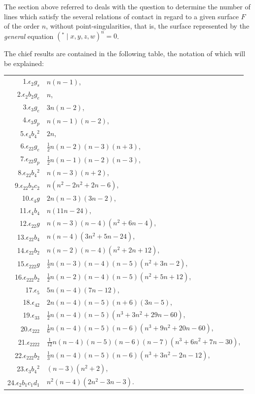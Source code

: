 \documentclass[11pt,a4paper]{book}
\begin{document}
The section above referred to deals with the question to determine the number of lines which satisfy the several relations of contact in regard to a given surface $F$ of the order $n$, without point-singularities, that is, the surface represented by the \textit{general} equation $({}^*\mid x, y, z, w)^n = 0$.

The chief results are contained in the following table, the notation of which will be explained:

\begin{center}
\begin{tabular}{r @{\ $=$\ }l}
1.\quad $\epsilon_2 g_s$ & $n(n-1)$, \\[2pt]
2.\quad $\epsilon_2 b_2 g_e$ & $n$, \\[2pt]
3.\quad $\epsilon_3 g_e$ & $3n(n-2)$, \\[2pt]
4.\quad $\epsilon_3 g_p$ & $n(n-1)(n-2)$, \\[2pt]
5.\quad $\epsilon_4 b_4{}^2$ & $2n$, \\[2pt]
6.\quad $\epsilon_{22} g_e$ & $\frac{1}{2}n(n-2)(n-3)(n+3)$, \\[2pt]
7.\quad $\epsilon_{22} g_p$ & $\frac{1}{2}n(n-1)(n-2)(n-3)$, \\[2pt]
8.\quad $\epsilon_{22} b_4{}^2$ & $n(n-3)(n+2)$, \\[2pt]
9.\quad $\epsilon_{22} b_2 c_2$ & $n(n^2 - 2n^2 + 2n - 6)$, \\[2pt]
10.\quad $\epsilon_4 g$ & $2n(n-3)(3n-2)$, \\[2pt]
11.\quad $\epsilon_4 b_4$ & $n(11n - 24)$, \\[2pt]
12.\quad $\epsilon_{22} g$ & $n(n-3)(n-4)(n^2 + 6n - 4)$, \\[2pt]
13.\quad $\epsilon_{22} b_4$ & $n(n-4)(3n^2 + 5n - 24)$, \\[2pt]
14.\quad $\epsilon_{22} b_2$ & $n(n-2)(n-4)(n^2 + 2n + 12)$, \\[2pt]
15.\quad $\epsilon_{222} g$ & $\frac{1}{3}n(n-3)(n-4)(n-5)(n^2 + 3n - 2)$, \\[2pt]
16.\quad $\epsilon_{222} b_2$ & $\frac{1}{2}n(n-2)(n-4)(n-5)(n^2 + 5n + 12)$, \\[2pt]
17.\quad $\epsilon_5$ & $5n(n-4)(7n - 12)$, \\[2pt]
18.\quad $\epsilon_{42}$ & $2n(n-4)(n-5)(n+6)(3n-5)$, \\[2pt]
19.\quad $\epsilon_{33}$ & $\frac{1}{2}n(n-4)(n-5)(n^3 + 3n^2 + 29n - 60)$, \\[2pt]
20.\quad $\epsilon_{222}$ & $\frac{1}{6}n(n-4)(n-5)(n-6)(n^3 + 9n^2 + 20n - 60)$, \\[2pt]
21.\quad $\epsilon_{2222}$ & $\frac{1}{12}n(n-4)(n-5)(n-6)(n-7)(n^3 + 6n^2 + 7n - 30)$, \\[2pt]
22.\quad $\epsilon_{222} b_2$ & $\frac{1}{3}n(n-4)(n-5)(n-6)(n^3 + 3n^2 - 2n - 12)$, \\[2pt]
23.\quad $\epsilon_3 b_4{}^2$ & $(n-3)(n^2 + 2)$, \\[2pt]
24.\quad $\epsilon_2 b_1 c_1 d_1$ & $n^2(n-4)(2n^2 - 3n - 3)$.
\end{tabular}
\end{center}
\end{document}
